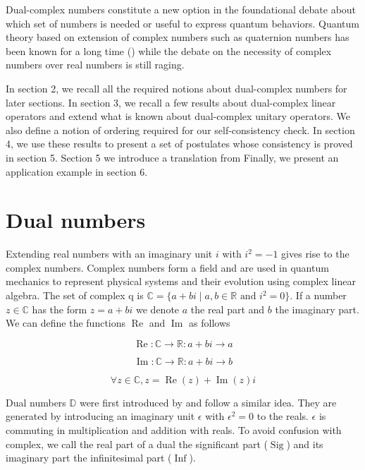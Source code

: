 \documentclass{article}
\newcommand{\R}{\mathbb{R}}
\newcommand{\C}{\mathbb{C}}
\newcommand{\D}{\mathbb{D}}
\newcommand{\e}{\epsilon}
\renewcommand{\Re}{\operatorname{Re}}
\renewcommand{\Im}{\operatorname{Im}}
\newcommand{\Sig}{\operatorname{Sig}}
\newcommand{\Inf}{\operatorname{Inf}}
\begin{document}
Dual-complex numbers constitute a new option in the foundational debate about which set of numbers is needed or useful to express quantum behaviors. Quantum theory based on extension of complex numbers such as quaternion numbers has been known for a long time (\cite{finkelstein1962}) while the debate on the necessity of complex numbers over real numbers is still raging. \cite{hoffreumon2025}

In section 2, we recall all the required notions about dual-complex numbers for later sections. In section 3, we recall a few results about dual-complex linear operators and extend what is known about dual-complex unitary operators. We also define a notion of ordering required for our self-consistency check. In section 4, we use these results to present a set of postulates whose consistency is proved in section 5.
Section 5 we introduce a translation from
Finally, we present an application example in section 6.

\section{Dual numbers}
\noindent Extending real numbers with an imaginary unit $i$ with $i^2 = -1$ gives rise to the complex numbers. Complex numbers form a field and are used in quantum mechanics to represent physical systems and their evolution using complex linear algebra. The set of complex q is $\C = \{a + bi \; | \; a, b \in \R \text{ and } i^2 = 0\}$. If a number $z \in \C$ has the form $z = a + bi$ we denote $a$ the real part and $b$ the imaginary part. We can define the functions $\Re$ and $\Im$ as follows
\begin{multicols}{3}
\noindent
\begin{equation}
\Re: \C \to \R: a + bi \to a
\end{equation}

\columnbreak
\noindent
\begin{equation}
\Im: \C \to \R: a + bi \to b
\end{equation}

\columnbreak
\noindent
\begin{equation}
\forall z \in \C, z = \Re(z) + \Im(z)i
\end{equation}

\end{multicols}

Dual numbers $\D$ were first introduced by \cite{clifford1871} and follow a similar idea. They are generated by introducing an imaginary unit $\e$ with $\e^2 = 0$ to the reals. $\e$ is commuting in multiplication and addition with reals. To avoid confusion with complex, we call the real part of a dual the significant part ($\Sig$) and its imaginary part the infinitesimal part ($\Inf$).
\end{document}
